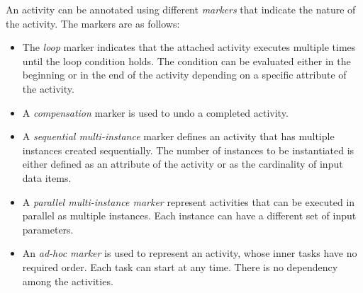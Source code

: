 An activity can be annotated using different \emph{markers} that indicate the nature of the activity. The markers are as follows:
\begin{itemize}
\item The \emph{loop} marker indicates that the attached activity executes multiple times until the loop condition holds. The condition can be evaluated either in the beginning or in the end of the activity depending on a specific attribute of the activity.

\item A \emph{compensation} marker is used to undo a completed activity.%
\item A \emph{sequential multi-instance} marker defines an activity that has multiple instances created sequentially. The number of instances to be instantiated is either defined as an attribute of the activity or as the cardinality of input data items.%
\item A \emph{parallel multi-instance marker} represent activities that can be executed  in parallel as multiple instances. Each instance can have a different set of input parameters.
\item An \emph{ad-hoc marker} is used to represent an activity, whose inner tasks have no required order. Each task can start at any time.  There is no dependency among the activities.
\end{itemize}

